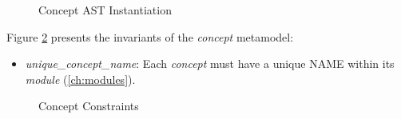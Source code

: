 \begin{figure}
\verbatimfont{\small}

\caption{Concept AST Instantiation}
\label{fig:ast:concept}
\end{figure}

\begin{constraints}
Figure \ref{fig:ocl:concept} presents the invariants of the \emph{concept} metamodel:

\begin{itemize}

\item \emph{unique\_concept\_name}:
Each \emph{concept} must have a unique NAME within its \emph{module} (\ref{ch:modules}).

\end{itemize}
\end{constraints}

\begin{figure}

\caption{Concept Constraints}
\label{fig:ocl:concept}
\end{figure}
